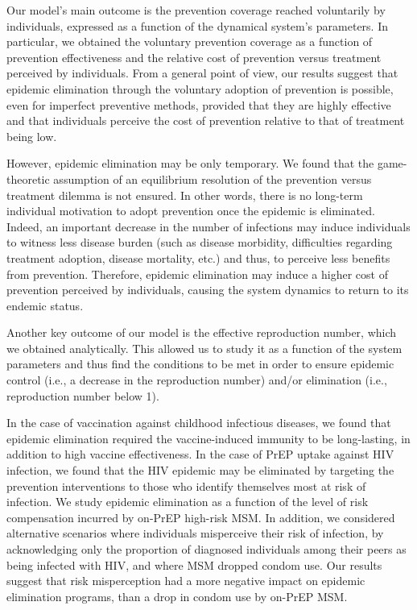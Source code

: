 Our model's main outcome is the prevention coverage reached voluntarily by individuals, expressed as a function of the dynamical system's parameters. In particular, we obtained the voluntary prevention coverage as a function of prevention effectiveness and the relative cost of prevention versus treatment perceived by individuals. From a general point of view, our results suggest that epidemic elimination through the voluntary adoption of prevention is possible, even for imperfect preventive methods, provided that they are highly effective and that individuals perceive the cost of prevention relative to that of treatment being low. 

However, epidemic elimination may be only temporary. We found that the game-theoretic assumption of an equilibrium resolution of the prevention versus treatment dilemma is not ensured. In other words, there is no long-term individual motivation to adopt prevention once the epidemic is eliminated. Indeed, an important decrease in the number of infections may induce individuals to witness less disease burden (such as disease morbidity, difficulties regarding treatment adoption, disease mortality, etc.) and thus, to perceive less benefits from prevention. Therefore, epidemic elimination may induce a higher cost of prevention perceived by individuals, causing the system dynamics to return to its endemic status.

Another key outcome of our model is the effective reproduction number, which we obtained analytically. This allowed us to study it as a function of the system parameters and thus find the conditions to be met in order to ensure epidemic control (i.e., a decrease in the reproduction number) and/or elimination (i.e., reproduction number below 1). 

In the case of vaccination against childhood infectious diseases, we found that epidemic elimination required the vaccine-induced immunity to be long-lasting, in addition to high vaccine effectiveness. In the case of PrEP uptake against HIV infection, we found that the HIV epidemic may be eliminated by targeting the prevention interventions to those who identify themselves most at risk of infection. We study epidemic elimination as a function of the level of risk compensation incurred by on-PrEP high-risk MSM. In addition, we considered  alternative scenarios where individuals misperceive their risk of infection, by acknowledging only the proportion of diagnosed individuals among their peers as being infected with HIV, and where MSM dropped condom use. Our results suggest that risk misperception had a more negative impact on epidemic elimination programs, than a drop in condom use by on-PrEP MSM.

